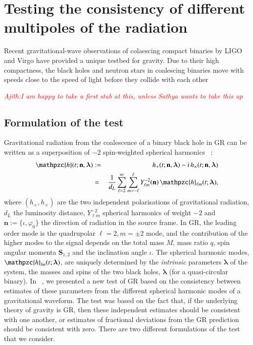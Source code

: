 \documentclass[prd,preprintnumbers,twocolumn,eqsecnum,floatfix,a4paper,nofootinbib,superscriptaddress]{revtex4}
\newcommand{\ajith}[1]{\textcolor{red}{\textit{Ajith:#1}}}
\newcommand{\h}{\mathpzc{h}}
\newcommand{\hlm}{\mathpzc{h}_{\ell m}}
\newcommand{\Ylm}{{Y}^{-2}_{\ell m}}
\newcommand{\blambda}{\bm{\lambda}}
\newcommand{\n}{\mathbf{n}}
\begin{document}

\section{Testing the consistency of different multipoles of the radiation}

Recent gravitational-wave observations of colaescing compact binaries by LIGO and Virgo have provided a unique testbed for gravity. Due to their high compactness, the black holes and neutron stars in coalescing binaries move with speeds close to the speed of light before they collide with each other 

\ajith{I am happy to take a first stab at this, unless Sathya wants to take this up}

\subsection{Formulation of the test}

Gravitational radiation from the coalescence of a binary black hole in GR can be written as a superposition of $-2$ spin-weighted spherical harmonics ~\cite{NewmanPenrose}:
\begin{eqnarray}
\h(t; \n, \blambda) &:=& h_+(t; \n, \blambda) - i \, h_\times(t; \n, \blambda) \\
&=& \frac{1}{d_L} \sum _{\ell=2}^{\infty} \sum _{m=-\ell}^{\ell} {\Ylm} (\n) \, {{\hlm}(t; {\blambda})}, 
\label{eq:spherical_harmonics}
\end{eqnarray}
where $(h_+, h_{\times})$ are the two independent polarisations of gravitational radiation, $d_L$ the luminosity distance, ${\Ylm}$ spherical harmonics of weight $-2$ and $\n := \{\iota, \varphi_0\}$ the direction of radiation in the source frame. In GR, the leading order mode is the quadrupolar $\ell = 2, m = \pm 2$ mode, and the contribution of the higher modes to the signal depends on the total mass $M$, mass ratio $q$, spin angular momenta ${\mathbf S}_{1,2}$ and the inclination angle $\iota$.  The spherical harmonic modes, ${\h}_{lm}(t; \blambda)$, are uniquely determined by the \emph{intrinsic} parameters $\blambda$ of the system, the masses and spins of the two black holes, $\blambda$ (for a quasi-circular binary). In ~\cite{Dhanpal:2018ufk}, we presented a new test of GR based on the consistency between estimates of these parameters from the different spherical harmonic modes of a gravitational waveform. The test was based on the fact that, if the underlying theory of gravity is GR, then these independent estimates should be consistent with one another, or estimates of fractional deviations from the GR prediction should be consistent with zero. There are two different formulations of the test that we consider.
\end{document}
